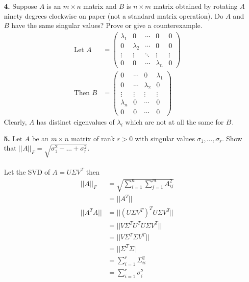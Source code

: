 \documentclass[11pt]{amsart}
\theoremstyle{definition}  %
\begin{document}
\vskip 0.1cm
\noindent
{\bf 4.} Suppose $A$ is an $m \times n$ matrix and $B$ is $n \times m$ matrix obtained by rotating $A$ ninety degrees clockwise on paper
(not a standard matrix operation). Do $A$ and $B$ have the same singular values? Prove or give a counterexample. \\
\begin{align*}
	\text{Let } A &= \left( \begin{array}{ccccc}
		\lambda_1 & 0 & \cdots & 0 & 0\\
		0 & \lambda_2 & \cdots & 0 & 0\\
		\vdots & \vdots & \ddots & \vdots & \vdots \\
		0 & 0 & \cdots & \lambda_n & 0
	\end{array}	 \right) \\
	\text{Then } B &= \left(\begin{array}{cccc}
		0 & \cdots & 0 & \lambda_1 \\
		0 & \cdots & \lambda_2 & 0 \\
		\vdots & \vdots & \vdots & \vdots \\
		\lambda_n & 0 & \cdots & 0 \\
		0 & 0 & \cdots & 0
	\end{array}	 \right)
\end{align*}Clearly, $A$ has distinct eigenvalues of $\lambda_i$ which are not at all the same for $B$.


\vskip 0.1cm
\noindent
{\bf 5.} Let $A$ be an $m \times n$ matrix of rank $r > 0$ with singular values $\sigma_1, \ldots, \sigma_r$. 
Show that $|| A ||_F = \sqrt{\sigma_1^2 + \ldots + \sigma_r^2}$. \\
\\
Let the SVD of $A = U\Sigma V^T$ then
\begin{align*}
	||A||_F &= \sqrt{\sum_{i=1}^n\sum_{j=1}^m A_{ij}^2 }\\
	& = ||A^T|| \\
	||A^T A|| &= || (U\Sigma V^T)^TU\Sigma V^T|| \\
	&= ||V\Sigma^T U^TU\Sigma V^T|| \\
	&= ||V\Sigma^T \Sigma V^T|| \\
	&= ||\Sigma^T \Sigma || \\
	&= \sum_{i=1}^r \Sigma_{ii}^2 \\
	&= \sum_{i=1}^r \sigma_{i}^2 \\
\end{align*}
\end{document}
